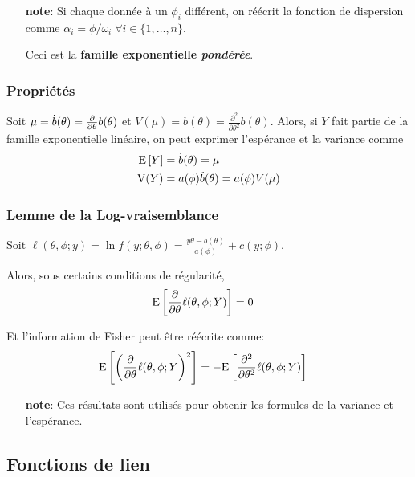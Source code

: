 \documentclass[10pt, french]{article}
\begin{document}
\begin{multicols*}{3}
\begin{enumerate}[label=\faAngleRight]
	\item[\textbf{note}: ]
		Si chaque donnée à un $\phi_i$ différent, on réécrit la fonction de dispersion comme $\alpha_i = \phi/\omega_i \; \forall i \in \{1, \dots, n \}$. 
		
		Ceci est la \textbf{famille exponentielle \textit{pondérée}}.
\end{enumerate}

\subsubsection*{Propriétés}

Soit $\mu = \dot{b}(\theta) = \frac{\partial}{\partial \theta} b(\theta)$ et $V(\mu) = \ddot{b}(\theta) = \frac{\partial^2}{\partial \theta^2} b(\theta)$. 
Alors, si $Y$ fait partie de la famille exponentielle linéaire, on peut exprimer l'espérance et la variance comme
\begin{align*}
\mathrm{E} \left[ Y \right]	
	&=	\dot{b}(\theta) 
	=	\mu 	\\
\text{V}(Y)	
	&=	a(\phi) \ddot{b}(\theta) 
	= 	a(\phi) V(\mu)	
\end{align*}

\subsubsection*{Lemme de la Log-vraisemblance}

Soit $\ell(\theta, \phi ; y) = \ln f(y ; \theta, \phi)  = \frac{y \theta - b(\theta)}{a(\phi)} + c(y ; \phi)$. 

Alors, sous certains conditions de régularité,
\begin{align*}
	\mathrm{E} \left[ \frac{\partial}{\partial \theta} \ell(\theta, \phi ; Y) \right] 
		&=	0 
\end{align*}

Et l'information de Fisher peut être réécrite comme:
\begin{align*}
	\mathrm{E} \left[ \left( \frac{\partial}{\partial \theta} \ell(\theta, \phi ; Y \right)^2 \right] 
		&=	-\mathrm{E} \left[ \frac{\partial^2}{\partial \theta^2} \ell(\theta, \phi ; Y) \right]
\end{align*}

\begin{enumerate}
	\item[\textbf{note}: ] Ces résultats sont utilisés pour obtenir les formules de la variance et l'espérance.

\end{enumerate}

\subsection*{Fonctions de lien}


\end{multicols*}
\end{document}

